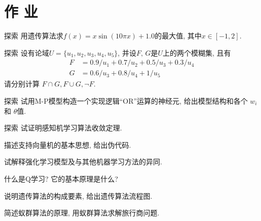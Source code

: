 \section{作      业}
\begin{custom}[explorecolor]{探索}
    用遗传算法求$f(x)=x\sin(10πx)+1.0$的最大值, 其中$x\in [-1,2]$.
\end{custom}
\begin{custom}[explorecolor]{探索}
设有论域$U=\{u_1, u_2, u_3, u_4, u_5\}$, 并设$F,\, G$是$U$上的两个模糊集, 且有
\begin{align*}
    F&=0.9/u_1+0.7/u_2+0.5/u_3+0.3/u_4\\
    G&=0.6/u_3+0.8/u_4+1/u_5
\end{align*}
请分别计算 $F\cap G, F\cup G,\neg F$.
\end{custom}
\begin{custom}[explorecolor]{探索}
    试用M-P模型构造一个实现逻辑``OR''运算的神经元, 给出模型结构和各个 $w_{i}$和 $\theta $值.
\end{custom}
\begin{custom}[explorecolor]{探索}
    试证明感知机学习算法收敛定理.
\end{custom}

\begin{think}
    描述支持向量机的基本思想, 给出伪代码.
\end{think}

\begin{think}
    试解释强化学习模型及与其他机器学习方法的异同.
\end{think}
\begin{think}
    什么是Q学习? 它的基本原理是什么?
\end{think}
\begin{think}
    说明遗传算法的构成要素, 给出遗传算法流程图.
\end{think}

\begin{think}
    简述蚁群算法的原理, 用蚁群算法求解旅行商问题.
\end{think}


